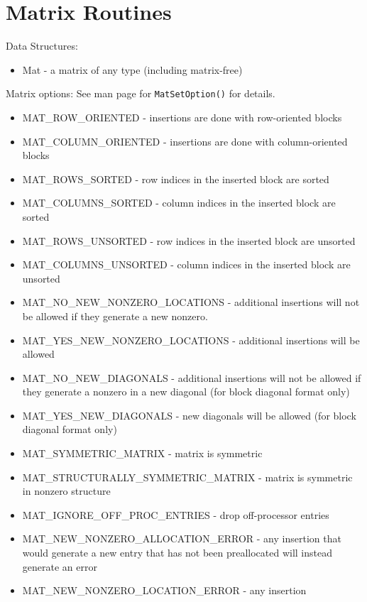 {

{\footnotesize
\noindent

}

\section{Matrix Routines}

\noindent
Data Structures: 
\begin{itemize}
\item Mat - a matrix of any type (including matrix-free)
\end{itemize}
Matrix options:  See man page for {\tt MatSetOption()} for details. 
\begin{itemize}
\item MAT\_ROW\_ORIENTED - insertions are done with row-oriented blocks
\item MAT\_COLUMN\_ORIENTED - insertions are done with column-oriented blocks
\item MAT\_ROWS\_SORTED - row indices in the inserted block are sorted
\item MAT\_COLUMNS\_SORTED - column indices in the inserted block are sorted
\item MAT\_ROWS\_UNSORTED - row indices in the inserted block are unsorted
\item MAT\_COLUMNS\_UNSORTED - column indices in the inserted block are unsorted
\item MAT\_NO\_NEW\_NONZERO\_LOCATIONS - additional insertions will not be allowed if they
      generate a new nonzero.
\item MAT\_YES\_NEW\_NONZERO\_LOCATIONS - additional insertions will be allowed
\item MAT\_NO\_NEW\_DIAGONALS - additional insertions will not be allowed if
         they generate a nonzero in a new diagonal (for block diagonal format only)
\item MAT\_YES\_NEW\_DIAGONALS - new diagonals will be allowed (for block diagonal format only)
\item MAT\_SYMMETRIC\_MATRIX - matrix is symmetric
\item MAT\_STRUCTURALLY\_SYMMETRIC\_MATRIX - matrix is symmetric in nonzero structure
\item MAT\_IGNORE\_OFF\_PROC\_ENTRIES - drop off-processor entries
\item MAT\_NEW\_NONZERO\_ALLOCATION\_ERROR - any insertion 
   that would generate a new entry that has not been preallocated will instead
   generate an error
\item MAT\_NEW\_NONZERO\_LOCATION\_ERROR - any insertion 

\end{itemize}}
